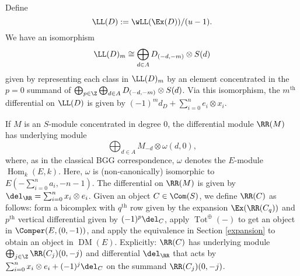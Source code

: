 \documentclass[12pt]{amsart}
\theoremstyle{definition}
\theoremstyle{remark}
\newcommand{\Hom}{\operatorname{Hom}} %
\def\on{\operatorname}
\def\om{\omega}
\def\DM{\operatorname{DM}}
\def\th{\on{th}}
\def\om{\omega}
\begin{document}
Define 
$$
\LL(D) := \wLL(\Ex(D)) / (u - 1).
$$
We have an isomorphism
\begin{equation}
\label{iso}
\LL(D)_m \cong \bigoplus_{d \in A} D_{(-d, -m)} \otimes S(d)
\end{equation}
given by representing each class in $\LL(D)_m$ by an element concentrated in the $p = 0$ summand of $\bigoplus_{p \in \Z}  \bigoplus_{d \in A} D_{(-d, -m)} \otimes S(d)$. Via this isomorphism, the $m^{\th}$ differential on $\LL(D)$ is given by $(-1)^{m}d_D + \sum_{i = 0}^n e_i \otimes x_i$.

\fi







If $M$ is an $S$-module concentrated in degree 0, the differential module $\RR(M)$ has underlying module
$$
\bigoplus_{d \in A} M_{-d} \otimes \om(d, 0),
$$
where, as in the classical BGG correspondence, $\om$ denotes the $E$-module $\Hom_k(E, k)$. Here, $\om$ is (non-canonically) isomorphic to $E(-\sum_{i = 0}^n a_i, -n-1)$. The differential on $\RR(M)$ is given by $\del_\RR = \sum_{i = 0}^n x_i \otimes e_i$.
Given an object $C \in \Com(S)$, we define $\RR(C)$ as follows: form a bicomplex with $q^{\th}$ row given by the expansion $\Ex(\RR(C_q))$ and $p^{\th}$ vertical differential given by $(-1)^p\del_C$, apply $\on{Tot}^{\oplus}( - )$ to get an object in $\Comper(E, (0,-1))$, and apply the equivalence in Section \ref{expansion} to obtain an object in $\DM(E)$. Explicitly: $\RR(C)$ has underlying module $\bigoplus_{j \in \Z} \RR(C_j)(0, -j)$ and differential $\del_\RR$ that acts by $ \sum_{i = 0}^n x_i \otimes e_i + (-1)^j\del_C$ on the summand $\RR(C_j)(0, -j)$.

\iffalse
\begin{equation}
\label{bicomplex}
\xymatrix{ 
& \ar[d]^-{\del}   & \ar[d]^-{\del}   & \\
\cdots & \RR(C_q)_p\ar[l]  \ar[d]^-{ \del}     & \RR(C_{q})_{p+1}   \ar[d]^-{ \del}  \ar[l]& \cdots \ar[l]\\
\cdots & \RR(C_{q - 1})_p\ar[d]^-{\del} \ar[l] &  \RR(C_{q -1})_{p+1} \ar[d]^-{\del}  \ar[l]& \ar[l]\cdots \\
&&&
}
\end{equation}
\fi
\end{document}
